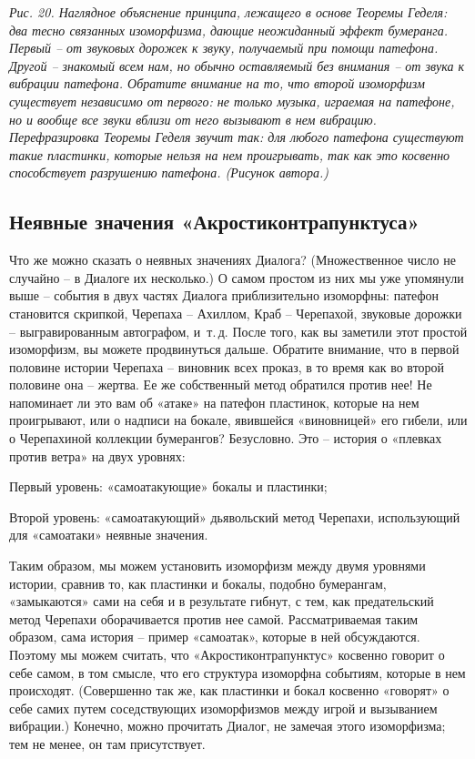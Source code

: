 \documentclass[../main.tex]{subfiles}
\begin{document}
\emph{Рис. 20. Наглядное объяснение принципа, лежащего в основе Теоремы Геделя: два тесно связанных изоморфизма, дающие неожиданный эффект бумеранга. Первый \--- от звуковых дорожек к звуку, получаемый при помощи патефона. Другой \--- знакомый всем нам, но обычно оставляемый без внимания \--- от звука к вибрации патефона. Обратите внимание на то, что второй изоморфизм существует независимо от первого: не только музыка, играемая на патефоне, но и вообще все звуки вблизи от него вызывают в нем вибрацию. Перефразировка Теоремы Геделя звучит так: для любого патефона существуют такие пластинки, которые нельзя на нем проигрывать, так как это косвенно способствует разрушению патефона. (Рисунок автора.)}


\subsection{Неявные значения «Акростиконтрапунктуса»}

Что же можно сказать о неявных значениях Диалога? (Множественное число не случайно \--- в Диалоге их несколько.) О самом простом из них мы уже упомянули выше \--- события в двух частях Диалога приблизительно изоморфны: патефон становится скрипкой, Черепаха \--- Ахиллом, Краб \--- Черепахой, звуковые дорожки \--- выгравированным автографом, и~т.\,д. После того, как вы заметили этот простой изоморфизм, вы можете продвинуться дальше. Обратите внимание, что в первой половине истории Черепаха \--- виновник всех проказ, в то время как во второй половине она \--- жертва. Ее же собственный метод обратился против нее! Не напоминает ли это вам об «атаке» на патефон пластинок, которые на нем проигрывают, или о надписи на бокале, явившейся «виновницей» его гибели, или о Черепахиной коллекции бумерангов? Безусловно. Это \--- история о «плевках против ветра» на двух уровнях:

\begin{block}
    Первый уровень: «самоатакующие» бокалы и пластинки;

    Второй уровень: «самоатакующий» дьявольский метод Черепахи, использующий для «самоатаки» неявные значения.
\end{block}

Таким образом, мы можем установить изоморфизм между двумя уровнями истории, сравнив то, как пластинки и бокалы, подобно бумерангам, «замыкаются» сами на себя и в результате гибнут, с тем, как предательский метод Черепахи оборачивается против нее самой. Рассматриваемая таким образом, сама история \--- пример «самоатак», которые в ней обсуждаются. Поэтому мы можем считать, что «Акростиконтрапунктус» косвенно говорит о себе самом, в том смысле, что его структура изоморфна событиям, которые в нем происходят. (Совершенно так же, как пластинки и бокал косвенно «говорят» о себе самих путем соседствующих изоморфизмов между игрой и вызыванием вибрации.) Конечно, можно прочитать Диалог, не замечая этого изоморфизма; тем не менее, он там присутствует.
\end{document}
